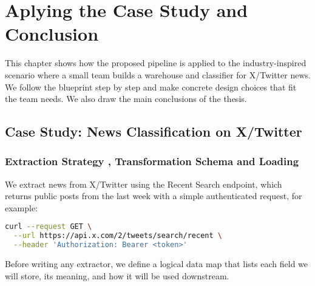\chapter{Aplying the Case Study and Conclusion}
\label{ch:conclusion}
This chapter shows how the proposed pipeline is applied to the industry-inspired scenario where a small team builds a warehouse and classifier for X/Twitter news. We follow the blueprint step by step and make concrete design choices that fit the team needs.
We also draw the main conclusions of the thesis.


\section{Case Study: News Classification on X/Twitter}

\subsection{Extraction Strategy , Transformation Schema and Loading}

We extract news from X/Twitter using the Recent Search endpoint, which returns public posts from the last week with a simple authenticated request, for example:
\begin{lstlisting}[language=bash,caption={Recent search via X API},label={lst:x-recent-search}]
curl --request GET \
  --url https://api.x.com/2/tweets/search/recent \
  --header 'Authorization: Bearer <token>'
\end{lstlisting}

Before writing any extractor, we define a logical data map that lists each field we will store, its meaning, and how it will be used downstream.


